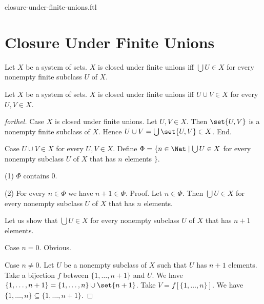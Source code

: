 \documentclass{naproche-library}
\begin{document}
\begin{smodule}{closure-under-finite-unions.ftl}

  \section*{Closure Under Finite Unions}

  \begin{definition}[forthel,id=FOUNDATIONS_14_7040118193913856]
    Let $X$ be a system of sets.
    $X$ is closed under finite unions iff $\bigcup U \in X$ for every nonempty finite subclass $U$ of $X$.
  \end{definition}

  \begin{proposition}[forthel,id=FOUNDATIONS_17_4164024962908160]
    Let $X$ be a system of sets.
    $X$ is closed under finite unions iff $U \cup V \in X$ for every $U, V \in X$.
  \end{proposition}
  \begin{proof}[forthel]
    Case $X$ is closed under finite unions.
      Let $U, V \in X$.
      Then $\set{U, V}$ is a nonempty finite subclass of $X$.
      Hence $U \cup V = \bigcup \set{U, V} \in X$.
    End.

    Case $U \cup V \in X$ for every $U, V \in X$.
      Define $\Phi = \{ n \in \Nat \mid \bigcup U \in X$ for every nonempty subclass $U$ of $X$ that has $n$ elements $\}$.

      (1) $\Phi$ contains $0$.

      (2) For every $n \in \Phi$ we have $n + 1 \in \Phi$. \newline
      Proof.
        Let $n \in \Phi$.
        Then $\bigcup U \in X$ for every nonempty subclass $U$ of $X$ that has $n$ elements.

        Let us show that $\bigcup U \in X$ for every nonempty subclass $U$ of $X$ that has $n + 1$ elements.

          Case $n = 0$. Obvious.

          Case $n \neq 0$.
            Let $U$ be a nonempty subclass of $X$ such that $U$ has $n + 1$ elements.
            Take a bijection $f$ between $\{1, \dots, n + 1 \}$ and $U$.
            We have $\{ 1, \dots, n + 1 \} = \{ 1, \dots, n \} \cup \set{n + 1}$.
            Take $V = f[\{ 1, \dots, n \}]$.
            We have $\{ 1, \dots, n \} \subseteq \{ 1, \dots, n + 1 \}$.


\end{proof}
\end{smodule}
\end{document}
